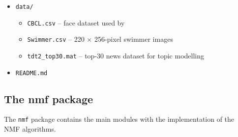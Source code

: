 {\begin{minipage}{\linewidth\fboxsep\fboxrule}
\begin{itemize}
\begin{itemize}
\begin{itemize}
                  \item \texttt{example\_topics\_extraction.py} %
                  \item \texttt{example\_top\_30.py} %
            \end{itemize}
        \end{itemize}
      \item \texttt{data/}
        \begin{itemize}
          \item \texttt{CBCL.csv} \hfill -- face dataset used by \cite{Lee1999}
          \item \texttt{Swimmer.csv} \hfill -- 220 $\times$ 256-pixel swimmer images
          \item \texttt{tdt2\_top30.mat} \hfill -- top-30 news dataset for topic modelling
        \end{itemize}
      \item \texttt{README.md}
    \end{itemize}
  \end{minipage}%
}

\subsection{The nmf package} \label{nmf package section}
The \texttt{nmf} package contains the main modules with the implementation of the NMF algorithms.
